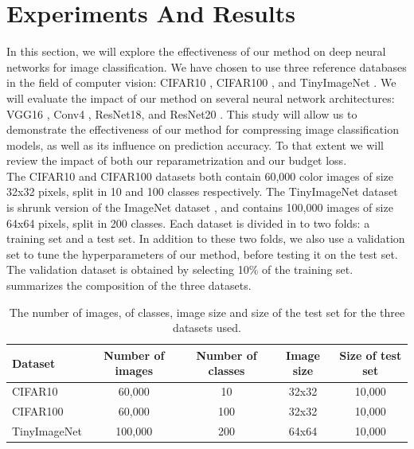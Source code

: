 
\section{Experiments And Results}
\label{sec:chap1:experiments}

In this section, we will explore the effectiveness of our method on  deep neural
networks for image classification. We have chosen to use three reference
databases in the field of computer vision: CIFAR10 \cite{CIFARdataset}, CIFAR100
\cite{CIFARdataset}, and TinyImageNet \cite{TinyImageNet}. We will evaluate the
impact of our method on several neural network architectures: VGG16
\cite{DBLP:journals/corr/SimonyanZ14a}, Conv4 \cite{DBLP:conf/iclr/FrankleC19},
ResNet18, and ResNet20 \cite{DBLP:conf/cvpr/HeZRS16}. This study will allow us
to demonstrate the effectiveness of our method for compressing image
classification models, as well as its influence on prediction accuracy. To that
extent we will review the impact of both our reparametrization and our budget
loss.\\

The CIFAR10 and CIFAR100 datasets both contain 60,000 color images of size 32x32 pixels,
split in 10 and 100 classes respectively. The TinyImageNet dataset is shrunk version of
the ImageNet dataset \cite{DBLP:journals/ijcv/RussakovskyDSKS15}, and contains
100,000 images of size 64x64 pixels, split in 200 classes. Each dataset is
divided in to two folds: a training set and a test set. In addition to these two
folds, we also use a validation set to tune the hyperparameters of our method,
before testing it on the test set. The validation dataset is obtained by
selecting 10\% of the training set.  summarizes the
composition of the three datasets.\\


\begin{table}[h]
  \centering
  \begin{tabular}{lcccc}
    \toprule
    \textbf{Dataset} & \textbf{Number of images} & \textbf{Number of classes} &
    \textbf{Image size} & \textbf{Size of test set} \\ 
    \hline
    CIFAR10 & 60,000 & 10 & 32x32 & 10,000 \\ 
    CIFAR100 & 60,000 & 100 & 32x32 & 10,000\\ 
    TinyImageNet & 100,000 & 200 & 64x64 &10,000 \\ 
    \bottomrule
  \end{tabular}
  \caption{The number of images, of classes, image size and size of the test set for the three datasets used.}
  \label{tab:chap1:datasets}
\end{table}

